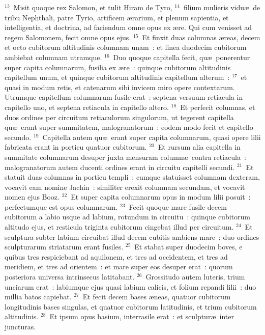 ${}^{13}$~Misit quoque rex Salomon, et tulit Hiram de Tyro,
${}^{14}$~filium mulieris vidu\ae\ de tribu Nephthali, patre Tyrio, artificem \ae rarium, et plenum sapientia, et intelligentia, et doctrina, ad faciendum omne opus ex \ae re. Qui cum venisset ad regem Salomonem, fecit omne opus ejus.
${}^{15}$~Et finxit duas columnas \ae reas, decem et octo cubitorum altitudinis columnam unam~: et linea duodecim cubitorum ambiebat columnam utramque.
${}^{16}$~Duo quoque capitella fecit, qu\ae\ ponerentur super capita columnarum, fusilia ex \ae re~: quinque cubitorum altitudinis capitellum unum, et quinque cubitorum altitudinis capitellum alterum~:
${}^{17}$~et quasi in modum retis, et catenarum sibi invicem miro opere contextarum. Utrumque capitellum columnarum fusile erat~: septena versuum retiacula in capitello uno, et septena retiacula in capitello altero.
${}^{18}$~Et perfecit columnas, et duos ordines per circuitum retiaculorum singulorum, ut tegerent capitella qu\ae\ erant super summitatem, malogranatorum~: eodem modo fecit et capitello secundo.
${}^{19}$~Capitella autem qu\ae\ erant super capita columnarum, quasi opere lilii fabricata erant in porticu quatuor cubitorum.
${}^{20}$~Et rursum alia capitella in summitate columnarum desuper juxta mensuram column\ae\ contra retiacula~: malogranatorum autem ducenti ordines erant in circuitu capitelli secundi.
${}^{21}$~Et statuit duas columnas in porticu templi~: cumque statuisset columnam dexteram, vocavit eam nomine Jachin~: similiter erexit columnam secundam, et vocavit nomen ejus Booz.
${}^{22}$~Et super capita columnarum opus in modum lilii posuit~: perfectumque est opus columnarum.
${}^{23}$~Fecit quoque mare fusile decem cubitorum a labio usque ad labium, rotundum in circuitu~: quinque cubitorum altitudo ejus, et resticula triginta cubitorum cingebat illud per circuitum.
${}^{24}$~Et sculptura subter labium circuibat illud decem cubitis ambiens mare~: duo ordines sculpturarum striatarum erant fusiles.
${}^{25}$~Et stabat super duodecim boves, e quibus tres respiciebant ad aquilonem, et tres ad occidentem, et tres ad meridiem, et tres ad orientem~: et mare super eos desuper erat~: quorum posteriora universa intrinsecus latitabant.
${}^{26}$~Grossitudo autem luteris, trium unciarum erat~: labiumque ejus quasi labium calicis, et folium repandi lilii~: duo millia batos capiebat.
${}^{27}$~Et fecit decem bases \ae neas, quatuor cubitorum longitudinis bases singulas, et quatuor cubitorum latitudinis, et trium cubitorum altitudinis.
${}^{28}$~Et ipsum opus basium, interrasile erat~: et sculptur\ae\ inter juncturas.
